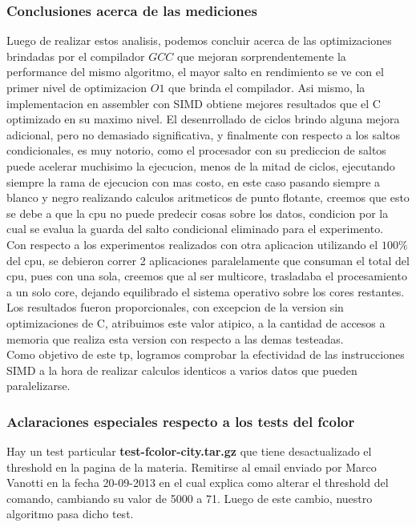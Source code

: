 \subsubsection{Conclusiones acerca de las mediciones}
Luego de realizar estos analisis, podemos concluir acerca de las optimizaciones brindadas por el compilador $GCC$ que mejoran sorprendentemente la performance del mismo algoritmo, el mayor salto en rendimiento se ve con el primer nivel de optimizacion $O1$ que brinda el compilador. Asi mismo, la implementacion en assembler con SIMD obtiene mejores resultados que el C optimizado en su maximo nivel. El desenrrollado de ciclos brindo alguna mejora adicional, pero no demasiado significativa, y finalmente con respecto a los saltos condicionales, es muy notorio, como el procesador con su prediccion de saltos puede acelerar muchisimo la ejecucion, menos de la mitad de ciclos, ejecutando siempre la rama de ejecucion con mas costo, en este caso pasando siempre a blanco y negro realizando calculos aritmeticos de punto flotante, creemos que esto se debe a que la cpu no puede predecir cosas sobre los datos, condicion por la cual se evalua la guarda del salto condicional eliminado para el experimento.\\

Con respecto a los experimentos realizados con otra aplicacion utilizando el $100\%$ del cpu, se debieron correr 2 aplicaciones paralelamente que consuman el total del cpu, pues con una sola, creemos que al ser multicore, trasladaba el procesamiento a un solo core, dejando equilibrado el sistema operativo sobre los cores restantes. Los resultados fueron proporcionales, con excepcion de la version sin optimizaciones de C, atribuimos este valor atipico, a la cantidad de accesos a memoria que realiza esta version con respecto a las demas testeadas.
\\
Como objetivo de este tp, logramos comprobar la efectividad de las instrucciones SIMD a la hora de realizar calculos identicos a varios datos que pueden paralelizarse.

\subsubsection{Aclaraciones especiales respecto a los tests del fcolor}
Hay un test particular \textbf{test-fcolor-city.tar.gz} que tiene desactualizado el threshold en la pagina de la materia. Remitirse al email enviado por Marco Vanotti en la fecha 20-09-2013 en el cual explica como alterar el threshold del comando, cambiando su valor de 5000 a 71. Luego de este cambio, nuestro algoritmo pasa dicho test.
\newpage

